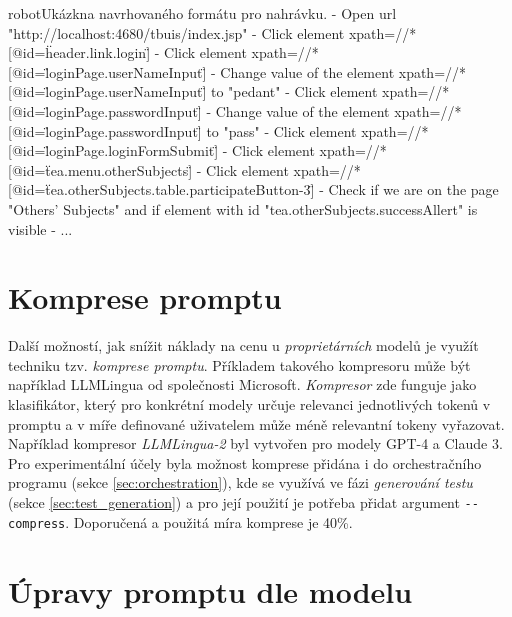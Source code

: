 \documentclass[czech, ma, kiv, he, iso690numb, pdf, viewonly]{fasthesis}
\begin{document}
    \begin{code}{robot}{Ukázkna navrhovaného formátu pro nahrávku. \label{lst:proposed_recording}}
- Open url "http://localhost:4680/tbuis/index.jsp"
- Click element xpath=//*[@id=\"header.link.login\"]
- Click element xpath=//*[@id=\"loginPage.userNameInput\"]
- Change value of the element xpath=//*[@id=\"loginPage.userNameInput\"] to "pedant"
- Click element xpath=//*[@id=\"loginPage.passwordInput\"]
- Change value of the element xpath=//*[@id=\"loginPage.passwordInput\"] to "pass"
- Click element xpath=//*[@id=\"loginPage.loginFormSubmit\"]
- Click element xpath=//*[@id=\"tea.menu.otherSubjects\"]
- Click element xpath=//*[@id=\"tea.otherSubjects.table.participateButton-3\"]
- Check if we are on the page "Others' Subjects" and if element with id "tea.otherSubjects.successAllert" is visible
    - ...\end{code}

    \section{Komprese promptu}

    Další možností, jak snížit náklady na cenu u \emph{proprietárních} modelů je využít techniku tzv. \textit{komprese promptu}. Příkladem takového kompresoru může být například LLMLingua od společnosti Microsoft. \cite{jiang2023llmlingua, pan2024llmlingua2} \textit{Kompresor} zde funguje jako klasifikátor, který pro konkrétní modely určuje relevanci jednotlivých tokenů v promptu a v míře definované uživatelem může méně relevantní tokeny vyřazovat. Například kompresor \textit{LLMLingua-2} byl vytvořen pro modely GPT-4 a Claude 3. Pro experimentální účely byla možnost komprese přidána i do orchestračního programu (sekce \ref{sec:orchestration}), kde se využívá ve fázi \textit{generování testu} (sekce \ref{sec:test_generation}) a pro její použití je potřeba přidat argument \verb|--compress|. Doporučená a použitá míra komprese je 40\%.

    \section{Úpravy promptu dle modelu}
\end{document}
